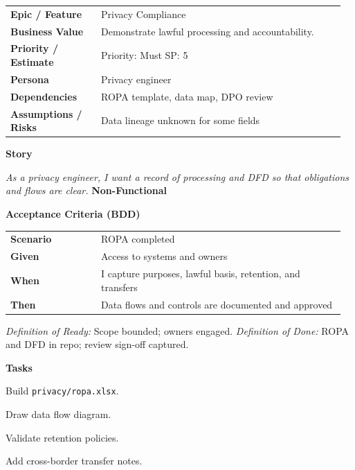 \documentclass[11pt,letterpaper]{article}
\makeatletter
\newenvironment{kvtable}{%
  \begin{tabular}{@{}>{\bfseries\arraybackslash}p{0.26\linewidth} p{0.70\linewidth}@{}}
}{\end{tabular}}
\newenvironment{bdd}{%
  \begin{tabular}{@{}>{\bfseries\arraybackslash}p{0.26\linewidth} p{0.70\linewidth}@{}}
}{\end{tabular}}
\newcommand{\DoRDoD}[2]{%
  \vspace{0.35em}
  {\footnotesize\color{Muted}%
    \textit{Definition of Ready:} #1 \; \textbullet\;
    \textit{Definition of Done:} #2%
  }%
}
\newenvironment{storycard}[2]{%
  \begin{tcolorbox}[cloudcard, title={#1 --- #2}]%
}{\end{tcolorbox}}
\newcommand{\sectionlabel}[1]{\vspace{0.35em}\textbf{#1}\par}
\makeatother
\begin{document}
\begin{storycard}{CCS-20}{Ch. 20 — Legal Compliance for Personal Data}
\begin{kvtable}
Epic / Feature & Privacy Compliance\\
Business Value & Demonstrate lawful processing and accountability.\\
Priority / Estimate & Priority: Must \quad SP: 5\\
Persona & Privacy engineer\\
Dependencies & ROPA template, data map, DPO review\\
Assumptions / Risks & Data lineage unknown for some fields\\
\end{kvtable}
\sectionlabel{Story}
\textit{As a privacy engineer, I want a record of processing and DFD so that obligations and flows are clear.}
\sectionlabel{Non-Functional}\;
\sectionlabel{Acceptance Criteria (BDD)}
\begin{bdd}
Scenario & ROPA completed\\
Given & Access to systems and owners\\
When & I capture purposes, lawful basis, retention, and transfers\\
Then & Data flows and controls are documented and approved\\
\end{bdd}
\DoRDoD{Scope bounded; owners engaged.}{ROPA and DFD in repo; review sign-off captured.}
\sectionlabel{Tasks}
\begin{checklist}
\item Build \texttt{privacy/ropa.xlsx}.
\item Draw data flow diagram.
\item Validate retention policies.
\item Add cross-border transfer notes.
\end{checklist}
\end{storycard}
\end{document}
